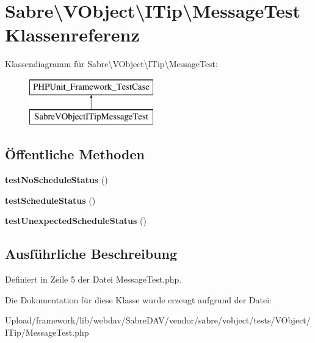 \hypertarget{class_sabre_1_1_v_object_1_1_i_tip_1_1_message_test}{}\section{Sabre\textbackslash{}V\+Object\textbackslash{}I\+Tip\textbackslash{}Message\+Test Klassenreferenz}
\label{class_sabre_1_1_v_object_1_1_i_tip_1_1_message_test}
Klassendiagramm für Sabre\textbackslash{}V\+Object\textbackslash{}I\+Tip\textbackslash{}Message\+Test\+:\begin{figure}[H]
\begin{center}
\leavevmode
\includegraphics[height=2.000000cm]{class_sabre_1_1_v_object_1_1_i_tip_1_1_message_test}
\end{center}
\end{figure}
\subsection*{Öffentliche Methoden}
\begin{DoxyCompactItemize}
\item 
\mbox{\label{class_sabre_1_1_v_object_1_1_i_tip_1_1_message_test_aa66806813ee633245c9b640999b46ac1}} 
{\bfseries test\+No\+Schedule\+Status} ()
\item 
\mbox{\label{class_sabre_1_1_v_object_1_1_i_tip_1_1_message_test_aeb2813af74c42e77dded3b4def722552}} 
{\bfseries test\+Schedule\+Status} ()
\item 
\mbox{\label{class_sabre_1_1_v_object_1_1_i_tip_1_1_message_test_af7b2d876a95b2af65e68599f5f1bd25d}} 
{\bfseries test\+Unexpected\+Schedule\+Status} ()
\end{DoxyCompactItemize}


\subsection{Ausführliche Beschreibung}


Definiert in Zeile 5 der Datei Message\+Test.\+php.



Die Dokumentation für diese Klasse wurde erzeugt aufgrund der Datei\+:\begin{DoxyCompactItemize}
\item 
Upload/framework/lib/webdav/\+Sabre\+D\+A\+V/vendor/sabre/vobject/tests/\+V\+Object/\+I\+Tip/Message\+Test.\+php\end{DoxyCompactItemize}
